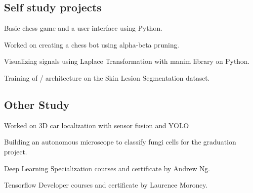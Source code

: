 \documentclass[letter, 14pt]{article}
\begin{document}
\subsection{Self study projects}
\subtext{}
\begin{zitemize}
\item Basic chess game and a user interface using Python. \href{https://github.com/denizberkin/test_chess}{\color{black}\externallink}
\item Worked on creating a chess bot using alpha-beta pruning.
\item Visualizing signals using Laplace Transformation with manim library on Python.
\item Training of \href{https://arxiv.org/pdf/1505.04597}{\color{black}{UNet}}/\href{https://arxiv.org/pdf/2201.01266}{\color{black}{SwinUnetR}} architecture on the Skin Lesion Segmentation dataset.

\end{zitemize}

\subsection{Other Study}
\subtext{}
\begin{zitemize}
\item Worked on 3D car localization with sensor fusion and YOLO 
 \href{https://www.youtube.com/watch?v=FBLalZQ7VFo}{\color{black}\externallink}
\item Building an autonomous microscope to classify fungi cells for the graduation project.
\href{https://github.com/denizberkin/grad-project-without-database}{\color{black}\externallink}
\item Deep Learning Specialization courses and certificate by Andrew Ng. 
\href{https://www.coursera.org/account/accomplishments/specialization/certificate/WNJCS69WKCQ8}{\color{black}\externallink}
\item Tensorflow Developer courses and certificate by Laurence Moroney. 
\href{https://www.coursera.org/account/accomplishments/specialization/certificate/3WKMBQ8CVFY4}{\color{black}\externallink}
\end{zitemize}
\end{document}
